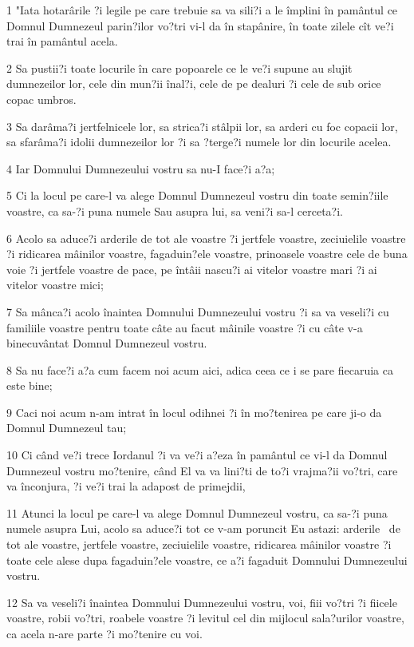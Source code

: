 \par 1 "Iata hotarârile ?i legile pe care trebuie sa va sili?i a le împlini în pamântul ce Domnul Dumnezeul parin?ilor vo?tri vi-l da în stapânire, în toate zilele cît ve?i trai în pamântul acela.
\par 2 Sa pustii?i toate locurile în care popoarele ce le ve?i supune au slujit dumnezeilor lor, cele din mun?ii înal?i, cele de pe dealuri ?i cele de sub orice copac umbros.
\par 3 Sa darâma?i jertfelnicele lor, sa strica?i stâlpii lor, sa arderi cu foc copacii lor, sa sfarâma?i idolii dumnezeilor lor ?i sa ?terge?i numele lor din locurile acelea.
\par 4 Iar Domnului Dumnezeului vostru sa nu-I face?i a?a;
\par 5 Ci la locul pe care-l va alege Domnul Dumnezeul vostru din toate semin?iile voastre, ca sa-?i puna numele Sau asupra lui, sa veni?i sa-l cerceta?i.
\par 6 Acolo sa aduce?i arderile de tot ale voastre ?i jertfele voastre, zeciuielile voastre ?i ridicarea mâinilor voastre, fagaduin?ele voastre, prinoasele voastre cele de buna voie ?i jertfele voastre de pace, pe întâii nascu?i ai vitelor voastre mari ?i ai vitelor voastre mici;
\par 7 Sa mânca?i acolo înaintea Domnului Dumnezeului vostru ?i sa va veseli?i cu familiile voastre pentru toate câte au facut mâinile voastre ?i cu câte v-a binecuvântat Domnul Dumnezeul vostru.
\par 8 Sa nu face?i a?a cum facem noi acum aici, adica ceea ce i se pare fiecaruia ca este bine;
\par 9 Caci noi acum n-am intrat în locul odihnei ?i în mo?tenirea pe care ji-o da Domnul Dumnezeul tau;
\par 10 Ci când ve?i trece Iordanul ?i va ve?i a?eza în pamântul ce vi-l da Domnul Dumnezeul vostru mo?tenire, când El va va lini?ti de to?i vrajma?ii vo?tri, care va înconjura, ?i ve?i trai la adapost de primejdii,
\par 11 Atunci la locul pe care-l va alege Domnul Dumnezeul vostru, ca sa-?i puna numele asupra Lui, acolo sa aduce?i tot ce v-am poruncit Eu astazi: arderile  de tot ale voastre, jertfele voastre, zeciuielile voastre, ridicarea mâinilor voastre ?i toate cele alese dupa fagaduin?ele voastre, ce a?i fagaduit Domnului Dumnezeului vostru.
\par 12 Sa va veseli?i înaintea Domnului Dumnezeului vostru, voi, fiii vo?tri ?i fiicele voastre, robii vo?tri, roabele voastre ?i levitul cel din mijlocul sala?urilor voastre, ca acela n-are parte ?i mo?tenire cu voi.
